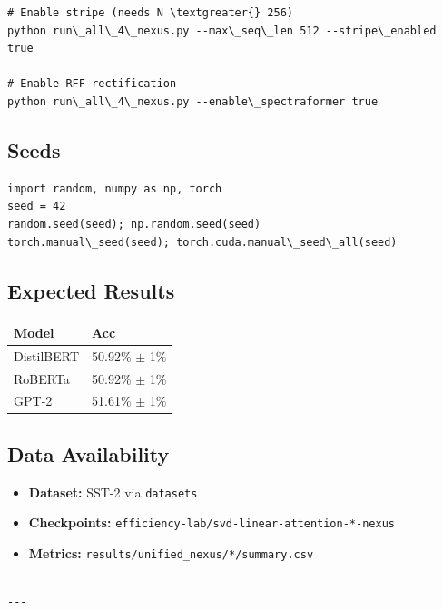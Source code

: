 \begin{lstlisting}
# Enable stripe (needs N \textgreater{} 256)
python run\_all\_4\_nexus.py --max\_seq\_len 512 --stripe\_enabled true

# Enable RFF rectification
python run\_all\_4\_nexus.py --enable\_spectraformer true
\end{lstlisting}

\subsection{Seeds}

\begin{lstlisting}
import random, numpy as np, torch
seed = 42
random.seed(seed); np.random.seed(seed)
torch.manual\_seed(seed); torch.cuda.manual\_seed\_all(seed)
\end{lstlisting}

\subsection{Expected Results}

\begin{table}[H]
\centering
\small
\begin{tabular}{ll}
\toprule
\textbf{Model} & \textbf{Acc} \\
\midrule
DistilBERT & 50.92\% $\pm$ 1\% \\
RoBERTa & 50.92\% $\pm$ 1\% \\
GPT-2 & 51.61\% $\pm$ 1\% \\
\bottomrule
\end{tabular}
\end{table}

\subsection{Data Availability}

\begin{itemize}
\item \textbf{Dataset:} SST-2 via \texttt{datasets}
\item \textbf{Checkpoints:} \texttt{efficiency-lab/svd-linear-attention-*-nexus}
\item \textbf{Metrics:} \texttt{results/unified\_nexus/*/summary.csv}
\end{itemize}
\begin{lstlisting}

---
\end{lstlisting}

